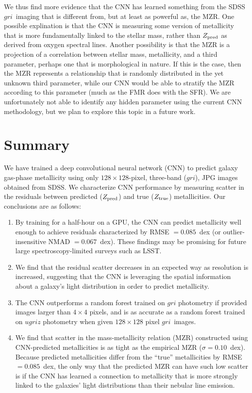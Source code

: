 \documentclass[fleqn,usenatbib]{mnras}
\newcommand{\sdssg}{\hbox{$g$}}
\newcommand{\sdssr}{\hbox{$r$}}
\newcommand{\sdssi}{\hbox{$i$}}
\begin{document}
We thus find more evidence that the CNN has learned something from the SDSS \sdssg\sdssr\sdssi\ imaging that is different from, but at least as powerful as, the MZR. One possible explination is that the CNN is measuring some version of metallicity that is more fundamentally linked to the stellar mass, rather than $Z_{\rm pred}$ as derived from oxygen spectral lines. Another possibility is that the MZR is a projection of a correlation between stellar mass, metallicity, and a third parameter, perhaps one that is morphological in nature. If this is the case, then the \cite{Tremonti2004} MZR represents a relationship that is randomly distributed in the yet unknown third parameter, while our CNN would be able to stratify the MZR according to this parameter (much as the FMR does with the SFR). We are unfortunately not able to identify any hidden parameter using the current CNN methodology, but we plan to explore this topic in a future work.

\section{Summary}\label{sec:summary}
We have trained a deep convolutional neural network (CNN) to predict galaxy gas-phase metallicity using only $128 \times 128$-pixel, three-band (\sdssg\sdssr\sdssi), JPG images obtained from SDSS. We characterize CNN performance by measuring scatter in the residuals between predicted ($Z_{\rm pred}$) and true ($Z_{\rm true}$) metallicities.
Our conclusions are as follows:

\begin{enumerate}
	\item By training for a half-hour on a GPU, the CNN can predict metallicity well enough to achieve residuals characterized by RMSE $= 0.085$~dex (or outlier-insensitive NMAD $= 0.067$~dex). These findings may be promising for future large spectroscopy-limited surveys such as LSST.

	\item We find that the residual scatter decreases in an expected way as resolution is increased, suggesting that the CNN is leveraging the spatial information about a galaxy's light distribution in order to predict metallicity.

	\item The CNN outperforms a random forest trained on $gri$ photometry if provided images larger than $4\times 4$ pixels, and is as accurate as a random forest trained on $ugriz$ photometry when given $128 \times 128$ pixel \sdssg\sdssr\sdssi\ images.

	\item We find that scatter in the mass-metallicity relation (MZR) constructed using CNN-predicted metallicities is as tight as the empirical MZR ($\sigma = 0.10$~dex).	Because predicted metallicities differ from the ``true'' metallicities by RMSE $= 0.085$~dex, the only way that the predicted MZR can have such low scatter is if the CNN has learned a connection to metallicity that is more strongly linked to the galaxies' light distributions than their nebular line emission.
\end{enumerate}
\end{document}
